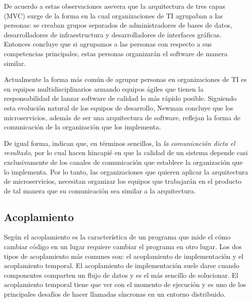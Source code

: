 
De acuerdo a estas observaciones \cite{newman2019monolith} asevera que la arquitectura de tres capas
(MVC) surge de la forma en la cual organizaciones de TI agrupaban a las personas: se creaban grupos
separados de administradores de bases de datos, desarrolladores de infraestructura y desarrolladores
de interfaces gráficas. Entonces concluye que si agrupamos a las personas con respecto a sus competencias
principales, estas personas organizarán el software de manera similar.

Actualmente la forma más común de agrupar personas en organizaciones de TI es en equipos multidisciplinarios
armando equipos ágiles que tienen la responsabilidad de lanzar software de calidad lo más rápido posible.
Siguiendo esta evolución natural de los equipos de desarrollo, Newman concluye que los microservicios,
además de ser una arquitectura de software, reflejan la forma de comunicación de la organización
que los implementa.

De igual forma, \cite{nadareishvili2016microservice} indican que, en términos sencillos, la
{\it la comunicación dicta el resultado}, por lo cual hacen hincapié en que la calidad de un sistema
depende casi exclusivamente de los canales de comunicación que establece la organización que lo implementa.
Por lo tanto, las organizaciones que quieren aplicar la arquitectura de microservicios, necesitan
organizar los equipos que trabajarán en el producto de tal manera que su comunicación sea similar a 
la arquitectura.


\subsection{Acoplamiento}

Según \cite{newman2019monolith} el acoplamiento es la característica de un programa que mide el cómo
cambiar código en un lugar requiere cambiar el programa en otro lugar.
Los dos tipos de acoplamiento más comunes son: el acoplamiento de implementación y el acoplamiento temporal.
El acoplamiento de implementación suele darse cuando componentes comparten un flujo de datos y es el más
sencillo de solucionar.
El acoplamiento temporal tiene que ver con el momento de ejecución y es uno de los principales
desafíos de hacer llamadas síncronas en un entorno distribuido.

